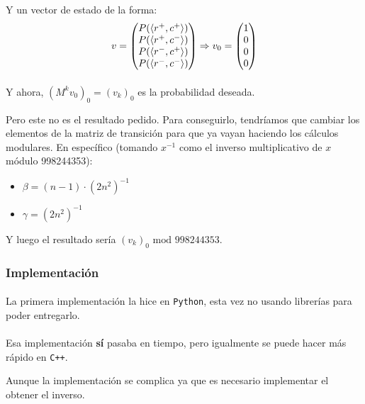 \documentclass[../main.tex]{subfiles}
\begin{document}
Y un vector de estado de la forma:
\begin{gather*}
  v = \begin{pmatrix}
    P(\langle r^{+}, c^{+} \rangle) \\ P(\langle r^{+}, c^{-} \rangle) \\ P(\langle r^{-}, c^{+} \rangle) \\ P(\langle r^{-}, c^{-} \rangle)
  \end{pmatrix} \Rightarrow v_{0} = \begin{pmatrix}
    1 \\ 0 \\ 0 \\ 0
  \end{pmatrix}
\end{gather*}

\paragraph{} Y ahora, \((M^{k}v_{0})_{0} = (v_{k})_{0}\) es la probabilidad deseada.

Pero este no es el resultado pedido. Para conseguirlo, tendríamos que cambiar los elementos de la matriz de transición para que ya vayan haciendo los cálculos modulares.  En específico (tomando \(x^{-1}\) como el inverso multiplicativo de \(x\) módulo 998244353):
\begin{itemize}
  \item \(\beta = (n-1) \cdot (2n^{2})^{-1}\)
  \item \(\gamma = (2n^{2})^{-1}\)
\end{itemize}
 Y luego el resultado sería \((v_{k})_{0} \text{ mod } 998244353\).

\subsubsection{Implementación}

\paragraph{} La primera implementación la hice en \texttt{Python}, esta vez no usando librerías para poder entregarlo.



\paragraph{} Esa implementación \textbf{sí} pasaba en tiempo, pero igualmente se puede hacer más rápido en \texttt{C++}.

Aunque la implementación se complica ya que es necesario implementar el obtener el inverso.


\end{document}
